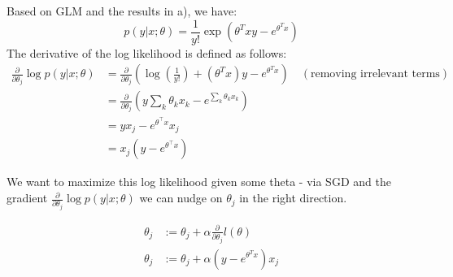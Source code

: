 \begin{answer}

Based on GLM and the results in a), we have:
\[ p(y|x; \theta) = \frac{1}{y!} \exp(\theta^T x y - e^{\theta^T x}) \]
The derivative of the log likelihood is defined as follows:
\begin{align*}
    \frac{\partial}{\partial \theta_j} \log p(y|x; \theta) &= \frac{\partial}{\partial \theta_j} (\log(\frac{1}{y!})+ (\theta^T x) y - e^{\theta^T x}) \quad (\text{removing irrelevant terms}) \\
    &= \frac{\partial}{\partial \theta_j} \left( y \sum_k \theta_k x_k - e^{\sum_k \theta_k x_k} \right) \\
    &= y x_j - e^{\theta^\top x} x_j \\
    &= x_j \left( y - e^{\theta^\top x} \right)
\end{align*}
    
We want to maximize this log likelihood given some theta - via SGD and the gradient $\frac{\partial}{\partial \theta_j} \log p(y|x;\theta)$ we can nudge on $\theta_j$ in the right direction.

\begin{align*}
    \theta_j &:= \theta_j + \alpha \frac{\partial}{\partial \theta_j} l(\theta) \\
    \theta_j &:= \theta_j + \alpha(y - e^{\theta^T x})x_j
\end{align*}
\end{answer}
